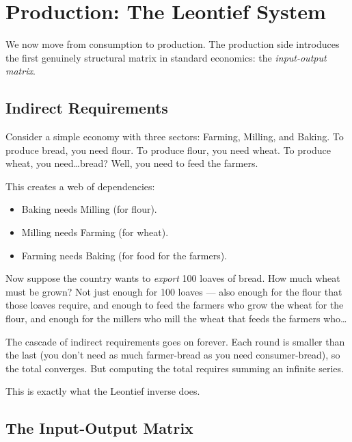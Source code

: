 \documentclass[../structural_economics_book.tex]{subfiles}
\begin{document}
\section{Production: The Leontief System}
\label{ch01:sec:leontief}

We now move from consumption to production. The production side introduces the first genuinely structural matrix in standard economics: the \textit{input-output matrix}.

\subsection{Indirect Requirements}

Consider a simple economy with three sectors: Farming, Milling, and Baking. To produce bread, you need flour. To produce flour, you need wheat. To produce wheat, you need\ldots bread? Well, you need to feed the farmers.

This creates a web of dependencies:
\begin{itemize}
\item Baking needs Milling (for flour).
\item Milling needs Farming (for wheat).
\item Farming needs Baking (for food for the farmers).
\end{itemize}

Now suppose the country wants to \textit{export} 100 loaves of bread. How much wheat must be grown? Not just enough for 100 loaves --- also enough for the flour that those loaves require, and enough to feed the farmers who grow the wheat for the flour, and enough for the millers who mill the wheat that feeds the farmers who\ldots

The cascade of indirect requirements goes on forever. Each round is smaller than the last (you don't need as much farmer-bread as you need consumer-bread), so the total converges. But computing the total requires summing an infinite series.

This is exactly what the Leontief inverse does.

\subsection{The Input-Output Matrix}
\end{document}
